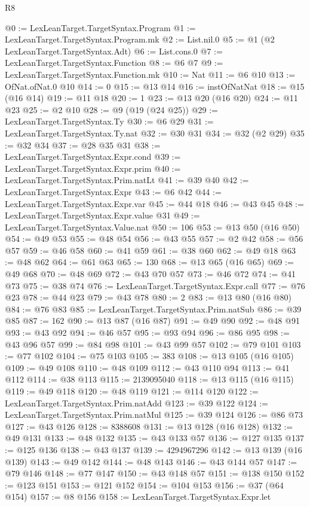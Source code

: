 \begin{lexlean}{R8}
\begin{coremodule}
@0 := LexLeanTarget.TargetSyntax.Program
@1 := LexLeanTarget.TargetSyntax.Program.mk
@2 := List.nil.{0}
@5 := @1 (@2 LexLeanTarget.TargetSyntax.Adt)
@6 := List.cons.{0}
@7 := LexLeanTarget.TargetSyntax.Function
@8 := @6 @7
@9 := LexLeanTarget.TargetSyntax.Function.mk
@10 := Nat
@11 := @6 @10
@13 := OfNat.ofNat.{0} @10
@14 := 0
@15 := @13 @14
@16 := instOfNatNat
@18 := @15 (@16 @14)
@19 := @11 @18
@20 := 1
@23 := @13 @20 (@16 @20)
@24 := @11 @23
@25 := @2 @10
@28 := @9 (@19 (@24 @25))
@29 := LexLeanTarget.TargetSyntax.Ty
@30 := @6 @29
@31 := LexLeanTarget.TargetSyntax.Ty.nat
@32 := @30 @31
@34 := @32 (@2 @29)
@35 := @32 @34
@37 := @28 @35 @31
@38 := LexLeanTarget.TargetSyntax.Expr.cond
@39 := LexLeanTarget.TargetSyntax.Expr.prim
@40 := LexLeanTarget.TargetSyntax.Prim.natLt
@41 := @39 @40
@42 := LexLeanTarget.TargetSyntax.Expr
@43 := @6 @42
@44 := LexLeanTarget.TargetSyntax.Expr.var
@45 := @44 @18
@46 := @43 @45
@48 := LexLeanTarget.TargetSyntax.Expr.value @31
@49 := LexLeanTarget.TargetSyntax.Value.nat
@50 := 106
@53 := @13 @50 (@16 @50)
@54 := @49 @53
@55 := @48 @54
@56 := @43 @55
@57 := @2 @42
@58 := @56 @57
@59 := @46 @58
@60 := @41 @59
@61 := @38 @60
@62 := @49 @18
@63 := @48 @62
@64 := @61 @63
@65 := 130
@68 := @13 @65 (@16 @65)
@69 := @49 @68
@70 := @48 @69
@72 := @43 @70 @57
@73 := @46 @72
@74 := @41 @73
@75 := @38 @74
@76 := LexLeanTarget.TargetSyntax.Expr.call
@77 := @76 @23
@78 := @44 @23
@79 := @43 @78
@80 := 2
@83 := @13 @80 (@16 @80)
@84 := @76 @83
@85 := LexLeanTarget.TargetSyntax.Prim.natSub
@86 := @39 @85
@87 := 162
@90 := @13 @87 (@16 @87)
@91 := @49 @90
@92 := @48 @91
@93 := @43 @92
@94 := @46 @57
@95 := @93 @94
@96 := @86 @95
@98 := @43 @96 @57
@99 := @84 @98
@101 := @43 @99 @57
@102 := @79 @101
@103 := @77 @102
@104 := @75 @103
@105 := 383
@108 := @13 @105 (@16 @105)
@109 := @49 @108
@110 := @48 @109
@112 := @43 @110 @94
@113 := @41 @112
@114 := @38 @113
@115 := 2139095040
@118 := @13 @115 (@16 @115)
@119 := @49 @118
@120 := @48 @119
@121 := @114 @120
@122 := LexLeanTarget.TargetSyntax.Prim.natAdd
@123 := @39 @122
@124 := LexLeanTarget.TargetSyntax.Prim.natMul
@125 := @39 @124
@126 := @86 @73
@127 := @43 @126
@128 := 8388608
@131 := @13 @128 (@16 @128)
@132 := @49 @131
@133 := @48 @132
@135 := @43 @133 @57
@136 := @127 @135
@137 := @125 @136
@138 := @43 @137
@139 := 4294967296
@142 := @13 @139 (@16 @139)
@143 := @49 @142
@144 := @48 @143
@146 := @43 @144 @57
@147 := @79 @146
@148 := @77 @147
@150 := @43 @148 @57
@151 := @138 @150
@152 := @123 @151
@153 := @121 @152
@154 := @104 @153
@156 := @37 (@64 @154)
@157 := @8 @156
@158 := LexLeanTarget.TargetSyntax.Expr.let

\end{coremodule}
\end{lexlean}

